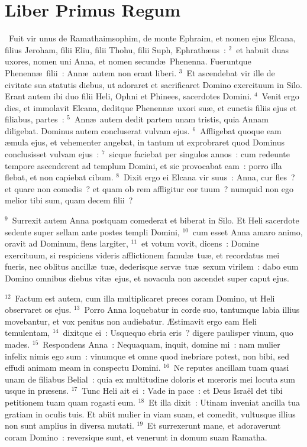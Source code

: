 {\centering \section*{Liber Primus Regum}}\thispagestyle{empty}

~\lettrine[lines=10,image=true,loversize=0.05,lraise=-0.03]{F}{}uit vir unus de Ramathaimsophim, de monte Ephraim, et nomen ejus Elcana, filius Jeroham, filii Eliu, filii Thohu, filii Suph, Ephrath\ae us~:
${}^{2}$~et habuit duas uxores, nomen uni Anna, et nomen secund\ae\ Phenenna. Fueruntque Phenenn\ae\ filii~: Ann\ae\ autem non erant liberi.
${}^{3}$~Et ascendebat vir ille de civitate sua statutis diebus, ut adoraret et sacrificaret Domino exercituum in Silo. Erant autem ibi duo filii Heli, Ophni et Phinees, sacerdotes Domini.
${}^{4}$~Venit ergo dies, et immolavit Elcana, deditque Phenenn\ae\ uxori su\ae , et cunctis filiis ejus et filiabus, partes~:
${}^{5}$~Ann\ae\ autem dedit partem unam tristis, quia Annam diligebat. Dominus autem concluserat vulvam ejus.
${}^{6}$~Affligebat quoque eam \ae mula ejus, et vehementer angebat, in tantum ut exprobraret quod Dominus conclusisset vulvam ejus~:
${}^{7}$~sicque faciebat per singulos annos~: cum redeunte tempore ascenderent ad templum Domini, et sic provocabat eam~: porro illa flebat, et non capiebat cibum.
${}^{8}$~Dixit ergo ei Elcana vir suus~: Anna, cur fles~? et quare non comedis~? et quam ob rem affligitur cor tuum~? numquid non ego melior tibi sum, quam decem filii~?


${}^{9}$~Surrexit autem Anna postquam comederat et biberat in Silo. Et Heli sacerdote sedente super sellam ante postes templi Domini,
${}^{10}$~cum esset Anna amaro animo, oravit ad Dominum, flens largiter,
${}^{11}$~et votum vovit, dicens~: Domine exercituum, si respiciens videris afflictionem famul\ae\ tu\ae , et recordatus mei fueris, nec oblitus ancill\ae\ tu\ae , dederisque serv\ae\ tu\ae\ sexum virilem~: dabo eum Domino omnibus diebus vit\ae\ ejus, et novacula non ascendet super caput ejus.


${}^{12}$~Factum est autem, cum illa multiplicaret preces coram Domino, ut Heli observaret os ejus.
${}^{13}$~Porro Anna loquebatur in corde suo, tantumque labia illius movebantur, et vox penitus non audiebatur. \AE stimavit ergo eam Heli temulentam,
${}^{14}$~dixitque ei~: Usquequo ebria eris~? digere paulisper vinum, quo mades.
${}^{15}$~Respondens Anna~: Nequaquam, inquit, domine mi~: nam mulier infelix nimis ego sum~: vinumque et omne quod inebriare potest, non bibi, sed effudi animam meam in conspectu Domini.
${}^{16}$~Ne reputes ancillam tuam quasi unam de filiabus Belial~: quia ex multitudine doloris et mœroris mei locuta sum usque in pr\ae sens.
${}^{17}$~Tunc Heli ait ei~: Vade in pace~: et Deus Isra\"el det tibi petitionem tuam quam rogasti eum.
${}^{18}$~Et illa dixit~: Utinam inveniat ancilla tua gratiam in oculis tuis. Et abiit mulier in viam suam, et comedit, vultusque illius non sunt amplius in diversa mutati.
${}^{19}$~Et surrexerunt mane, et adoraverunt coram Domino~: reversique sunt, et venerunt in domum suam Ramatha.

